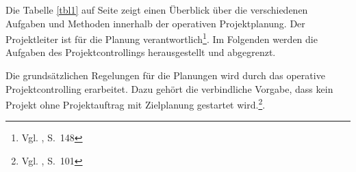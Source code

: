 Die Tabelle \ref{tbl1} auf Seite \pageref{tbl1} zeigt einen Überblick über die verschiedenen Aufgaben und Methoden innerhalb der operativen Projektplanung. 
Der Projektleiter ist für die Planung verantwortlich\footnote{Vgl. \cite{Kuster&Huber2011}, S.~148}. Im Folgenden werden die Aufgaben des Projektcontrollings herausgestellt und abgegrenzt.

Die grundsätzlichen Regelungen für die Planungen wird durch das operative Projektcontrolling erarbeitet. Dazu gehört die verbindliche Vorgabe, dass kein Projekt ohne Projektauftrag mit Zielplanung gestartet wird.\footnote{Vgl. \cite{Fiedler2008}, S.~101}. 

